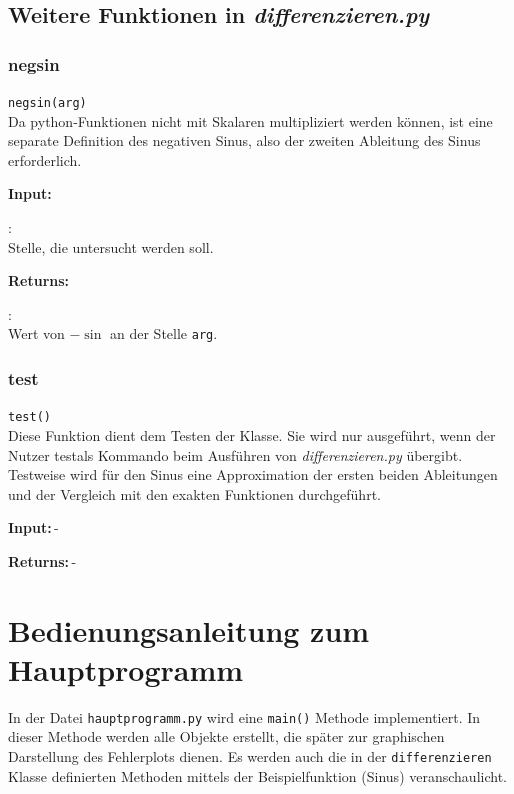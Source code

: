 \documentclass[smallheadings]{scrartcl}
\newcommand{\initem}[2]{\item[\hspace{0.5em} {\normalfont\ttfamily{#1}} {\normalfont\itshape{(#2)}}]}
\newcommand{\bfpara}[1]{
	
	\noindent \textbf{#1:}\,}
\begin{document}
\subsection{Weitere Funktionen in \emph{differenzieren.py}}

\subsubsection{negsin}

\texttt{negsin(arg)}\\
 Da python-Funktionen nicht mit Skalaren multipliziert werden können, ist eine separate Definition des negativen Sinus,
 also der zweiten Ableitung des Sinus erforderlich.
        
\bfpara{Input}
	    \begin{compactdesc}
		    \initem{arg}{float}: ~\\ Stelle, die untersucht werden soll.
	    \end{compactdesc}
\bfpara{Returns}
       \begin{compactdesc}
		    \initem{~}{float}: ~\\ Wert von $-\sin$ an der Stelle \texttt{arg}.
	    \end{compactdesc}
	    
\subsubsection{test}

\texttt{test()}\\
Diese Funktion dient dem Testen der Klasse. Sie wird nur ausgeführt, wenn der Nutzer \glqq test\grqq als Kommando beim Ausführen von \emph{differenzieren.py} übergibt. Testweise wird für den Sinus eine Approximation der ersten beiden Ableitungen und der Vergleich mit den exakten Funktionen durchgeführt.
        
\bfpara{Input}-
\bfpara{Returns}-



\section{Bedienungsanleitung zum Hauptprogramm}

In der Datei \texttt{hauptprogramm.py} wird eine \texttt{main()} Methode implementiert. In dieser Methode werden alle Objekte erstellt, die später zur graphischen Darstellung des Fehlerplots dienen. Es werden auch die in der \texttt{differenzieren} Klasse definierten Methoden mittels der Beispielfunktion (Sinus) veranschaulicht. 
\end{document}
